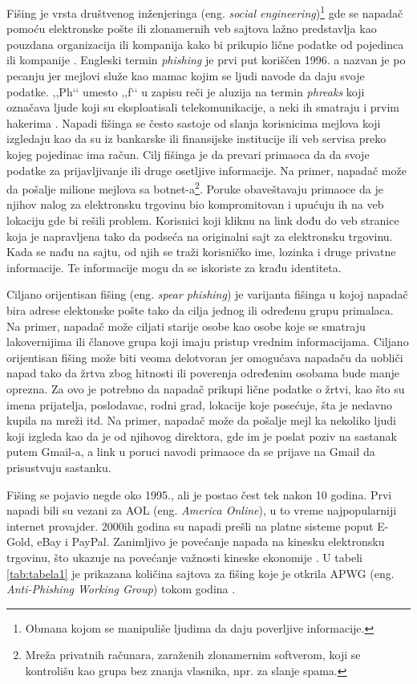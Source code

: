 \documentclass[a4paper]{article}
\theoremstyle{break}
\begin{document}
{Fišing je vrsta društvenog inženjeringa (eng. {\em social engineering})\footnote{Obmana kojom se manipuliše ljudima da daju poverljive informacije.} gde se napadač pomoću elektronske pošte ili zlonamernih veb sajtova lažno predstavlja kao pouzdana organizacija ili kompanija kako bi prikupio lične podatke od pojedinca ili kompanije \cite{phishing_us_cert}. Engleski termin {\em  phishing} je prvi put koriščen 1996. a nazvan je po pecanju jer mejlovi služe kao mamac kojim se ljudi navode da daju svoje podatke. ,,Ph‘‘ umesto ,,f‘‘ u zapisu reči je aluzija na termin {\em phreaks} koji označava ljude koji su eksploatisali telekomunikacije, a neki ih smatraju i prvim hakerima \cite{phishing_org}.
Napadi fišinga se često sastoje od slanja korisnicima mejlova koji izgledaju kao da su iz bankarske ili finansijske institucije ili veb servisa preko kojeg pojedinac ima račun. Cilj fišinga je da prevari primaoca da da svoje podatke za prijavljivanje ili druge osetljive informacije. 
Na primer, napadač može da pošalje milione mejlova sa botnet-a\footnote{Mreža privatnih računara, zaraženih zlonamernim softverom, koji se kontrolišu kao grupa bez znanja vlasnika, npr. za slanje spama.}. Poruke obaveštavaju primaoce da je njihov nalog za elektronsku trgovinu bio kompromitovan i upućuju ih na veb lokaciju gde bi rešili problem. Korisnici koji kliknu na link dođu do veb stranice koja je napravljena tako da podseća na originalni sajt za elektronsku trgovinu. Kada se nađu na sajtu, od njih se traži korisničko ime, lozinka i druge privatne informacije. Te informacije mogu da se iskoriste za krađu identiteta.

Ciljano orijentisan fišing (eng. {\em spear phishing}) je varijanta fišinga u kojoj napadač bira adrese elektonske pošte tako da cilja jednog ili određenu grupu primalaca. Na primer, napadač može ciljati starije osobe kao osobe koje se smatraju lakovernijima ili članove grupa koji imaju pristup vrednim informacijama. Ciljano orijentisan fišing može biti veoma delotvoran jer omogućava napadaču da uobliči napad tako da žrtva zbog hitnosti ili poverenja određenim osobama bude manje oprezna. Za ovo je potrebno da napadač prikupi lične podatke o žrtvi, kao što su imena prijatelja, poslodavac, rodni grad, lokacije koje posećuje, šta je nedavno kupila na mreži itd.
Na primer, napadač može da pošalje mejl ka nekoliko ljudi koji izgleda kao da je od njihovog direktora, gde im je poslat poziv na sastanak putem Gmail-a, a link u poruci navodi primaoce da se prijave na Gmail da prisustvuju sastanku. 

Fišing se pojavio negde oko 1995., ali je postao čest tek nakon 10 godina. Prvi napadi bili su vezani za AOL (eng. {\em America Online}), u to vreme najpopularniji internet provajder\cite {phishing_aol}. 2000ih godina su napadi prešli na platne sisteme poput E-Gold, eBay i PayPal.
Zanimljivo je povećanje napada na kinesku elektronsku trgovinu, što ukazuje na povećanje važnosti kineske ekonomije \cite{knjiga}.
U tabeli \ref{tab:tabela1} je prikazana količina sajtova za fišing koje je otkrila APWG (eng. {\em Anti-Phishing Working Group}) tokom godina \cite{apwg}.

}
\end{document}
